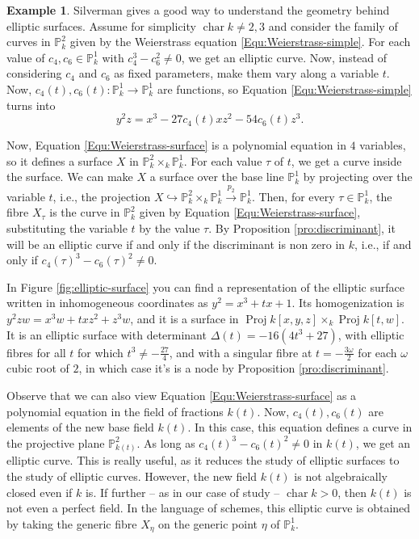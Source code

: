 \documentclass{report}
\DeclareMathOperator{\Proj}{Proj}
\DeclareMathOperator{\chara}{char}
\theoremstyle{definition}
\newtheorem{example}[equation]{Example}
\begin{document}
\begin{example}
Silverman \cite[Section~III.1]{silverman1994advanced} gives a good way to understand the geometry behind elliptic surfaces. Assume for simplicity $\chara k\neq2,3$ and consider the family of curves in $\mathbb{P}_k^2$ given by the Weierstrass equation \eqref{Equ:Weierstrass-simple}. For each value of $c_4,c_6\in\mathbb{P}_k^1$ with $c_4^3-c_6^2\neq0$, we get an elliptic curve. Now, instead of considering $c_4$ and $c_6$ as fixed parameters, make them vary along a variable $t$. Now, $c_4(t),c_6(t):\mathbb{P}_k^1\rightarrow\mathbb{P}_k^1$ are functions, so Equation \eqref{Equ:Weierstrass-simple} turns into
\begin{equation}
\label{Equ:Weierstrass-surface}
y^2z=x^3-27c_4(t)xz^2-54c_6(t)z^3.
\end{equation}

Now, Equation \eqref{Equ:Weierstrass-surface} is a polynomial equation in $4$ variables, so it defines a surface $X$ in $\mathbb{P}_k^2\times_k\mathbb{P}_k^1$. For each value $\tau$ of $t$, we get a curve inside the surface. We can make $X$ a surface over the base line $\mathbb{P}_k^1$ by projecting over the variable $t$, i.e., the projection $X\hookrightarrow\mathbb{P}_k^2\times_k\mathbb{P}_k^1\xrightarrow{p_2}\mathbb{P}_k^1$. Then, for every $\tau\in\mathbb{P}_k^1$, the fibre $X_{\tau}$ is the curve in $\mathbb{P}_k^2$ given by Equation \eqref{Equ:Weierstrass-surface}, substituting the variable $t$ by the value $\tau$. By Proposition \ref{pro:discriminant}, it will be an elliptic curve if and only if the discriminant is non zero in $k$, i.e., if and only if $c_4(\tau)^3-c_6(\tau)^2\neq0$.

In Figure \ref{fig:elliptic-surface} you can find a representation of the elliptic surface written in inhomogeneous coordinates as $y^2=x^3+tx+1$. Its homogenization is $y^2zw=x^3w+txz^2+z^3w$, and it is a surface in $\Proj k[x,y,z]\times_k\Proj k[t,w]$. It is an elliptic surface with determinant $\Delta(t)=-16(4t^3+27)$, with elliptic fibres for all $t$ for which $t^3\neq-\frac{27}{4}$, and with a singular fibre at $t=-\frac{3\omega}{2}$ for each $\omega$ cubic root of $2$, in which case it's is a node by Proposition \ref{pro:discriminant}.

Observe that we can also view Equation \eqref{Equ:Weierstrass-surface} as a polynomial equation in the field of fractions $k(t)$. Now, $c_4(t),c_6(t)$ are elements of the new base field $k(t)$. In this case, this equation defines a curve in the projective plane $\mathbb{P}_{k(t)}^2$. As long as $c_4(t)^3-c_6(t)^2\neq0$ in $k(t)$, we get an elliptic curve. This is really useful, as it reduces the study of elliptic surfaces to the study of elliptic curves. However, the new field $k(t)$ is not algebraically closed even if $k$ is. If further -- as in our case of study -- $\chara k>0$, then $k(t)$ is not even a perfect field. In the language of schemes, this elliptic curve is obtained by taking the generic fibre $X_{\eta}$ on the generic point $\eta$ of $\mathbb{P}_k^1$.


\end{example}
\end{document}
